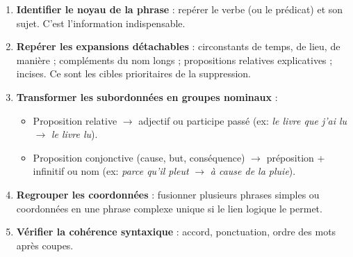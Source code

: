 \documentclass[11pt]{article}
\begin{document}
\begin{methode}
    \begin{enumerate}
        \item \textbf{Identifier le noyau de la phrase} : repérer le verbe (ou le prédicat) et son sujet. C'est l'information indispensable.
        \item \textbf{Repérer les expansions détachables} : circonstants de temps, de lieu, de manière ; compléments du nom longs ; propositions relatives explicatives ; incises. Ce sont les cibles prioritaires de la suppression.
        \item \textbf{Transformer les subordonnées en groupes nominaux} : 
            \begin{itemize}
                \item Proposition relative $\rightarrow$ adjectif ou participe passé (ex: \emph{le livre que j'ai lu} $\rightarrow$ \emph{le livre lu}).
                \item Proposition conjonctive (cause, but, conséquence) $\rightarrow$ préposition + infinitif ou nom (ex: \emph{parce qu'il pleut} $\rightarrow$ \emph{à cause de la pluie}).
            \end{itemize}
        \item \textbf{Regrouper les coordonnées} : fusionner plusieurs phrases simples ou coordonnées en une phrase complexe unique si le lien logique le permet.
        \item \textbf{Vérifier la cohérence syntaxique} : accord, ponctuation, ordre des mots après coupes.
    \end{enumerate}
\end{methode}
\end{document}

